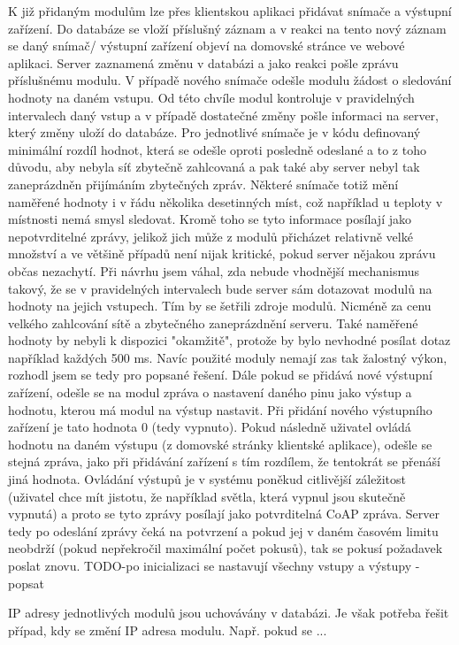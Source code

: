 K již přidaným modulům lze přes klientskou aplikaci přidávat snímače a výstupní zařízení. Do databáze se vloží příslušný záznam a v reakci na tento nový záznam se daný snímač/ výstupní zařízení objeví na domovské stránce ve webové aplikaci. Server zaznamená změnu v databázi a jako reakci pošle zprávu příslušnému modulu. 
V případě nového snímače odešle modulu žádost o sledování hodnoty na daném vstupu. Od této chvíle modul kontroluje v pravidelných intervalech daný vstup a v případě dostatečné změny pošle informaci na server, který změny uloží do databáze. Pro jednotlivé snímače je v kódu definovaný minimální rozdíl hodnot, která se odešle oproti posledně odeslané a to z toho důvodu, aby nebyla síť zbytečně zahlcovaná a pak také aby server nebyl tak zaneprázdněn přijímáním zbytečných zpráv. Některé snímače totiž mění naměřené hodnoty i v řádu několika desetinných míst, což například u teploty v místnosti nemá smysl sledovat. Kromě toho se tyto informace posílají jako nepotvrditelné zprávy, jelikož jich může z modulů přicházet relativně velké množství a ve většině případů není nijak kritické, pokud server nějakou zprávu občas nezachytí. Při návrhu jsem váhal, zda nebude vhodnější mechanismus takový, že se v pravidelných intervalech bude server sám dotazovat modulů na hodnoty na jejich vstupech. Tím by se šetřili zdroje modulů. Nicméně za cenu velkého zahlcování sítě a zbytečného zaneprázdnění serveru. Také naměřené hodnoty by nebyli k dispozici "okamžitě", protože by bylo nevhodné posílat dotaz například každých 500 ms. Navíc použité moduly nemají zas tak žalostný výkon, rozhodl jsem se tedy pro popsané řešení.
Dále pokud se přidává nové výstupní zařízení, odešle se na modul zpráva o nastavení daného pinu jako výstup a hodnotu, kterou má modul na výstup nastavit. Při přidání nového výstupního zařízení je tato hodnota 0 (tedy vypnuto). Pokud následně uživatel ovládá hodnotu na daném výstupu (z domovské stránky klientské aplikace), odešle se stejná zpráva, jako při přidávání zařízení s tím rozdílem, že tentokrát se přenáší jiná hodnota. Ovládání výstupů je v systému poněkud citlivější záležitost (uživatel chce mít jistotu, že například světla, která vypnul jsou skutečně vypnutá) a proto se tyto zprávy posílají jako potvrditelná CoAP zpráva. Server tedy po odeslání zprávy čeká na potvrzení a pokud jej v daném časovém limitu neobdrží (pokud nepřekročil maximální počet pokusů), tak se pokusí požadavek poslat znovu.
TODO-po inicializaci se nastavují všechny vstupy a výstupy - popsat


IP adresy jednotlivých modulů jsou uchovávány v databázi. Je však potřeba řešit případ, kdy se změní IP adresa modulu. Např. pokud se ...


